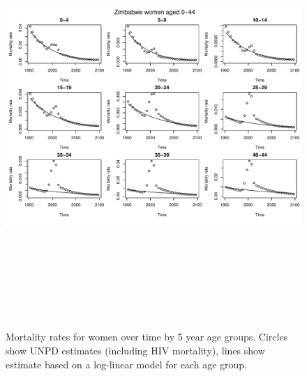 \documentclass{article}
\begin{document}
\begin{figure}
\includegraphics[width=16cm,height=16cm]{EstimatingRatesFromUNPDv2-MortalityWomen1} 

\caption{Mortality rates for women over time by 5 year age groups. Circles show UNPD estimates (including HIV mortality), lines show estimate based on a log-linear model for each age group.}
\label{Mortalitywomen1}
\end{figure}
\end{document}
